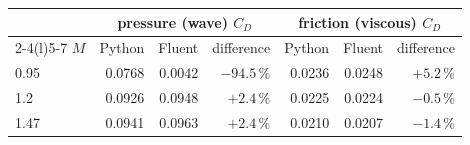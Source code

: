 \begin{tabular}{@{}lrrrrrr@{}}
\toprule
 & \multicolumn{3}{c}{pressure (wave) $C_D$} & \multicolumn{3}{c}{friction (viscous) $C_D$} \\
\cmidrule(lr){2-4}\cmidrule(l){5-7}
$M$ & Python & Fluent & difference & Python & Fluent & difference \\
\midrule
0.95 & 0.0768 & 0.0042 & $-94.5$\,\% & 0.0236 & 0.0248 & $+5.2$\,\% \\
1.2 & 0.0926 & 0.0948 & $+2.4$\,\% & 0.0225 & 0.0224 & $-0.5$\,\% \\
1.47 & 0.0941 & 0.0963 & $+2.4$\,\% & 0.0210 & 0.0207 & $-1.4$\,\% \\
\bottomrule
\end{tabular}
